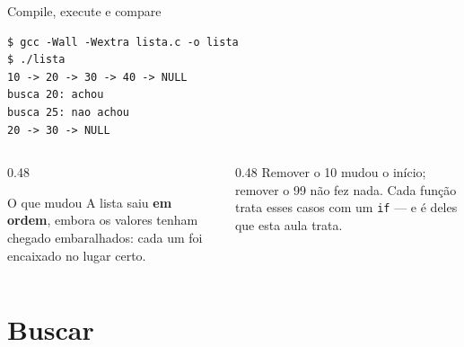 \documentclass[aspectratio=169]{beamer}
\begin{document}
\begin{frame}[fragile]{Compile, execute e compare}
\begin{lstlisting}[style=shellStyle]
$ gcc -Wall -Wextra lista.c -o lista
$ ./lista
10 -> 20 -> 30 -> 40 -> NULL
busca 20: achou
busca 25: nao achou
20 -> 30 -> NULL
\end{lstlisting}
  \begin{columns}[T]
    \begin{column}{0.48\textwidth}
      \begin{block}{O que mudou}
        \small A lista saiu \textbf{em ordem}, embora os valores tenham
        chegado embaralhados: cada um foi encaixado no lugar certo.
      \end{block}
    \end{column}
    \begin{column}{0.48\textwidth}
      \small Remover o 10 mudou o início; remover o 99 não fez nada. Cada
      função trata esses casos com um \texttt{if} --- e é deles que esta
      aula trata.
    \end{column}
  \end{columns}
\end{frame}

\section{Buscar}
\end{document}

